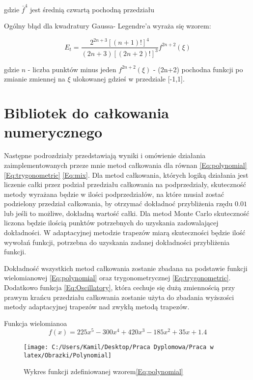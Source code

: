 \documentclass[12pt,twoside]{article}
\begin{document}
gdzie $\bar{f}^{4}$ jest średnią czwartą pochodną przedziału

Ogólny błąd dla kwadratury Gaussa- Legendre'a wyraża się wzorem:

\begin{equation}
E_t = \frac{2^{2n+3}[(n+1)!]^4}{(2n+3)[(2n+2)!]^3}f^{2n+2}(\xi)
\label{Eq:rownanie}
\end{equation}

gdzie $n$ - liczba punktów minus jeden
$f^{2n+2}(\xi)$ - (2n+2) pochodna funkcji po zmianie zmiennej na $\xi$ ulokowanej gdzieś w przedziale [-1,1]. 


\section{Bibliotek do całkowania numerycznego}
Następne podrozdziały przedstawiają wyniki i omówienie działania zaimplementowanych przeze mnie metod całkowania dla równan \eqref{Eq:polynomial} \eqref{Eq:trygonometric} \eqref{Eq:mix}. Dla metod całkowania, których logiką działania jest liczenie całki przez podział przedziału całkowania na podprzedziały, skuteczność metody wyrażana będzie w ilości podprzedziałów, na które musiał zostać podzielony przedział całkowania, by otrzymać dokładnoć przybliżenia rzędu $0.01$ lub jeśli to możliwe, dokładną wartość całki.
Dla metod Monte Carlo skuteczność liczona będzie ilością punktów potrzebnych do uzyskania zadowalającej dokładności.
W adaptacyjnej metodzie trapezów miarą skuteczności będzie ilość wywołań funkcji, potrzebna do uzyskania zadanej dokładności przybliżenia funkcji.


Dokładność wszystkich metod całkowania zostanie zbadana na podstawie funkcji wielomianowej \eqref{Eq:polynomial} oraz trygonometrycznej \eqref{Eq:trygonometric}. Dodatkowo funkcja \eqref{Eq:Oscillatory}, która cechuje się dużą zmiennością przy prawym krańcu przedziału całkowania zostanie użyta do zbadania wyższości metody adaptacyjnej trapezów nad zwykłą metodą trapezów.

Funkcja wielomianoa
\begin{equation}
f(x) = 225x^5 - 300x^4 + 420x^3-185x^2+35x + 1.4
\label{Eq:polynomial}
\end{equation}

\begin{figure}[h]
\texttt{[image: C:/Users/Kamil/Desktop/Praca Dyplomowa/Praca w latex/Obrazki/Polynomial]}
\caption{Wykres funkcji zdefiniowanej wzorem\eqref{Eq:polynomial}}
\end{figure}
\end{document}
